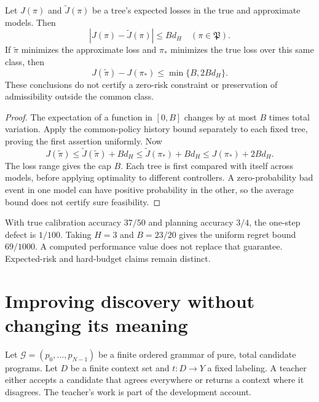 \begin{Coreproposition}\label{Core:r:policy-error}
Let $J(\pi)$ and $\widetilde J(\pi)$ be a tree's expected losses in the true and approximate models. Then
\[
 |J(\pi)-\widetilde J(\pi)|\le Bd_H\quad(\pi\in\mathfrak P).
\]
If $\widetilde\pi$ minimizes the approximate loss and $\pi_*$ minimizes the true loss over this same class, then
\[
 J(\widetilde\pi)-J(\pi_*)\le\min\{B,2Bd_H\}.
\]
These conclusions do not certify a zero-risk constraint or preservation of admissibility outside the common class.
\end{Coreproposition}
\begin{proof}
The expectation of a function in $[0,B]$ changes by at most $B$ times total variation. Apply the common-policy history bound separately to each fixed tree, proving the first assertion uniformly. Now
\[
 J(\widetilde\pi)\le\widetilde J(\widetilde\pi)+Bd_H
 \le\widetilde J(\pi_*)+Bd_H\le J(\pi_*)+2Bd_H.
\]
The loss range gives the cap $B$. Each tree is first compared with itself across models, before applying optimality to different controllers. A zero-probability bad event in one model can have positive probability in the other, so the average bound does not certify sure feasibility.
\end{proof}

With true calibration accuracy $37/50$ and planning accuracy $3/4$, the one-step defect is $1/100$. Taking $H=3$ and $B=23/20$ gives the uniform regret bound $69/1000$. A computed performance value does not replace that guarantee. Expected-risk and hard-budget claims remain distinct.


\chapter{Improving discovery without changing its meaning}\label{Core:book:chapter-6}
\setcounter{section}{0}\label{Core:ch:discovery}
Let $\mathcal G=(p_0,\ldots,p_{N-1})$ be a finite ordered grammar of pure, total candidate programs. Let $D$ be a finite context set and $t:D\to Y$ a fixed labeling. A teacher either accepts a candidate that agrees everywhere or returns a context where it disagrees. The teacher's work is part of the development account.

